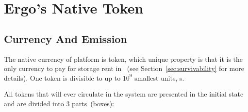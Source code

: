 \section{Ergo's Native Token}

\subsection{Currency And Emission}
\label{sec:currency}

The native currency of \Ergo{} platform is \Erg{} token, which unique property is
that it is the only currency to pay for storage rent in \Ergo{}~(see Section~\ref{sec:survivability} for more details).
One \Erg{} token is divisible to up to $10^9$ smallest units, \nanoErg{}s.

All \Erg{} tokens that will ever circulate in the system are presented in
the initial state and are divided into 3 parts~(boxes):


